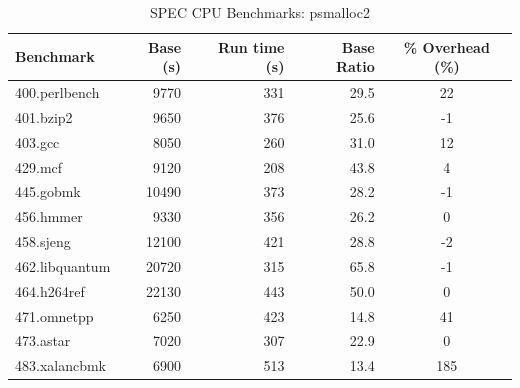 \documentclass[12pt]{cslreport}
\begin{document}
\begin{table}
\begin{center}
\begin{tabular}{|l|r|r|r|c|}
\hline
Benchmark  & Base  (s)  & Run time (s) &  Base Ratio & \% Overhead (\%) \\
\hline
400.perlbench    & 9770        & 331       & 29.5 & 22  \\   
401.bzip2        & 9650        & 376       & 25.6 & -1  \\
403.gcc          & 8050        & 260       & 31.0 & 12  \\
429.mcf          & 9120        & 208       & 43.8 & 4   \\
445.gobmk       & 10490        & 373       & 28.2 & -1  \\
456.hmmer       &  9330        & 356       & 26.2 & 0   \\
458.sjeng       & 12100        & 421       & 28.8 & -2  \\
462.libquantum  & 20720        & 315       & 65.8 & -1  \\
464.h264ref     & 22130        & 443       & 50.0 & 0   \\
471.omnetpp     &  6250        & 423       & 14.8 & 41  \\
473.astar       &  7020        & 307       & 22.9 & 0   \\
483.xalancbmk    & 6900        & 513       & 13.4 & 185 \\
\hline
\end{tabular}
\end{center}
\caption{SPEC CPU Benchmarks: psmalloc2}
\label{psmalloc2:spec}
\end{table}
\end{document}
